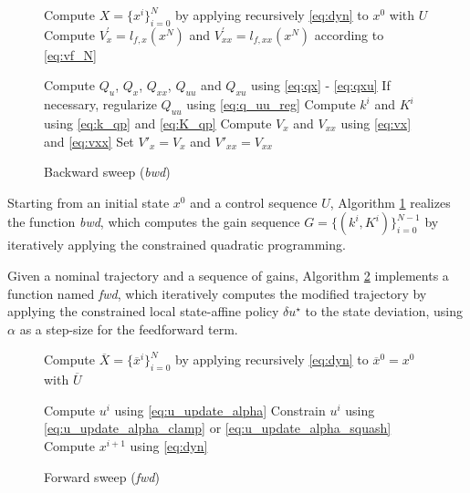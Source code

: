 \begin{figure}[H]
    \centering
    \begin{algorithm}[H]
        \caption{Backward sweep (\textit{bwd})}
        \label{alg:bwd}

        Compute $X = \{x^i\}_{i=0}^{N}$ by applying recursively \ref{eq:dyn} to $x^0$ with $U$\;
        Compute $V^\prime_x = l_{f, x}(x^N)$ and $V^\prime_{xx} = l_{f, xx}(x^N)$ according to \ref{eq:vf_N}\;

         {
            Compute $Q_u$, $Q_x$, $Q_{xx}$, $Q_{uu}$ and $Q_{xu}$ using \ref{eq:qx} - \ref{eq:qxu}\;
            If necessary, regularize $Q_{uu}$ using \ref{eq:q_uu_reg}\;
            Compute $k^i$ and $K^i$ using \ref{eq:k_qp} and \ref{eq:K_qp}\;
            Compute $V_x$ and $V_{xx}$ using \ref{eq:vx} and \ref{eq:vxx}\;
            Set $V'_x = V_x$ and $V'_{xx} = V_{xx}$\;
        }
    \end{algorithm}
\end{figure}

Starting from an initial state $x^0$ and a control sequence $U$, Algorithm \ref{alg:bwd} realizes the function \textit{bwd}, which computes the gain sequence $G = \{(k^i, K^i)\}_{i=0}^{N-1}$ by iteratively applying the constrained quadratic programming.

Given a nominal trajectory and a sequence of gains, Algorithm \ref{alg:fwd} implements a function named \textit{fwd}, which iteratively computes the modified trajectory by applying the constrained local state-affine policy $\delta u^\star$ to the state deviation, using $\alpha$ as a step-size for the feedforward term.

\begin{figure}[H]
    \centering
    \begin{algorithm}[H]
        \caption{Forward sweep (\textit{fwd})}
        \label{alg:fwd}

        Compute $\overline{X} = \{\overline{x}^i\}_{i=0}^{N}$ by applying recursively \ref{eq:dyn} to $\overline{x}^0 = x^0$ with $\overline{U}$\;

         {
            Compute $u^i$ using \ref{eq:u_update_alpha}\;
            Constrain $u^i$ using \ref{eq:u_update_alpha_clamp} or \ref{eq:u_update_alpha_squash}\;
            Compute $x^{i+1}$ using \ref{eq:dyn}\;
        }
    \end{algorithm}
\end{figure}

